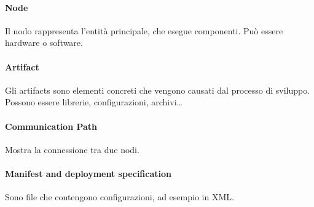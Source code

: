 \documentclass[11pt]{article}
\begin{document}
\paragraph{Node} Il nodo rappresenta l'entità principale, che esegue componenti. Può essere hardware o software.
\paragraph{Artifact} Gli artifacts sono elementi concreti che vengono causati dal processo di sviluppo. Possono essere librerie, configurazioni, archivi\dots
\paragraph{Communication Path} Mostra la connessione tra due nodi.
\paragraph{Manifest and deployment specification} Sono file che contengono configurazioni, ad esempio in XML.
\end{document}

